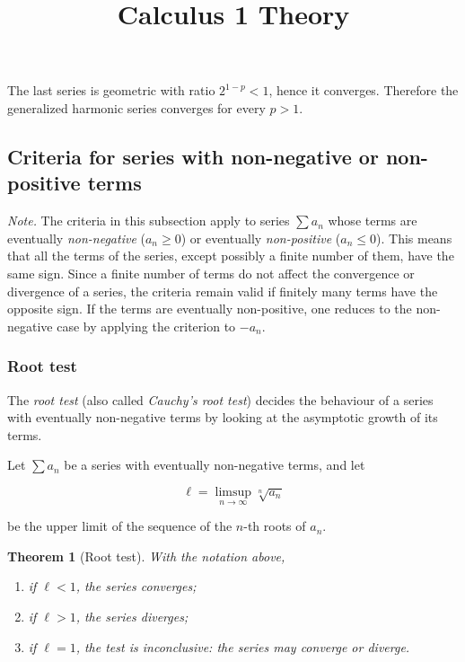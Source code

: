 \documentclass[11pt,a4paper]{article} \usepackage[T1]{fontenc}
\theoremstyle{plain} \newtheorem{theorem}{Theorem} \title{Calculus 1 Theory}
\begin{document}
The last series is geometric with ratio $2^{1-p}<1$, hence it converges.
Therefore the generalized harmonic series converges for every $p>1$.

\subsection {Criteria for series with non-negative or non-positive terms}

\emph{Note.} The criteria in this subsection apply to series $\sum a_n$ whose
terms are eventually \emph{non-negative} ($a_n\ge 0$) or eventually
\emph{non-positive} ($a_n\le 0$). This means that all the terms of the series,
except possibly a finite number of them, have the same sign. Since a finite
number of terms do not affect the convergence or divergence of a series, the
criteria remain valid if finitely many terms have the opposite sign. If the
terms are eventually non-positive, one reduces to the non-negative case by
applying the criterion to $-a_n$.

\subsubsection {Root test}

The \emph{root test} (also called \emph{Cauchy's root test}) decides the
behaviour of a series with eventually non-negative terms by looking at the
asymptotic growth of its terms.

\begin{definition}
 Let $\sum a_n$ be a series with eventually non-negative terms, and
let

\[
\ell = \limsup_{n\to\infty} \sqrt[n]{a_n}
\]

be the upper limit of the sequence of the $n$-th roots of $a_n$.
\end{definition}

\begin{theorem}
[Root test] With the notation above,

\begin{enumerate}
\item if $\ell<1$, the series \emph{converges}; \item if $\ell>1$, the series
\emph{diverges}; \item if $\ell=1$, the test is \emph{inconclusive}: the series
may converge or diverge.
\end{enumerate}

\end{theorem}
\end{document}
